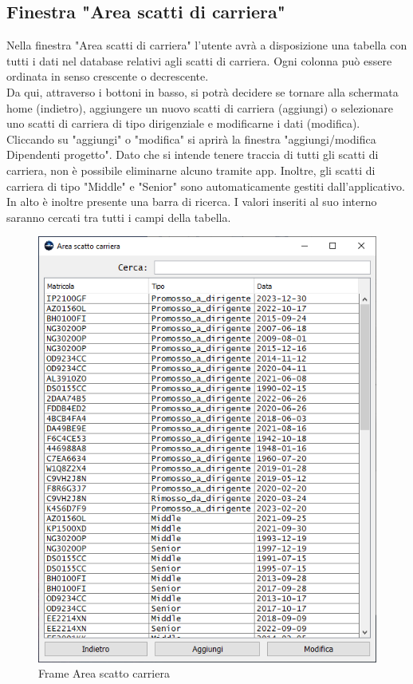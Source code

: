         \subsection {Finestra "Area scatti di carriera"}
            Nella finestra "Area scatti di carriera" l'utente avrà a disposizione una tabella con tutti i dati nel database relativi agli scatti di carriera. Ogni colonna può essere ordinata in senso crescente o decrescente.\\
            Da qui, attraverso i bottoni in basso, si potrà decidere se tornare alla schermata home (indietro), aggiungere un nuovo scatti di carriera (aggiungi) o selezionare uno scatti di carriera di tipo dirigenziale e modificarne i dati (modifica). Cliccando su "aggiungi" o "modifica" si aprirà la finestra "aggiungi/modifica Dipendenti progetto". Dato che si intende tenere traccia di tutti gli scatti di carriera, non è possibile eliminarne alcuno tramite app. Inoltre, gli scatti di carriera di tipo "Middle" e "Senior" sono automaticamente gestiti dall'applicativo.\\
            In alto è inoltre presente una barra di ricerca. I valori inseriti al suo interno saranno cercati tra tutti i campi della tabella.
            \begin{figure}[htbp!]
                \centering
                    \vspace{2\baselineskip}
                    \includegraphics[width=0.6\linewidth]{Immagini/Frames/Frame Area/Frame Area scatto carriera.png}
                \caption{Frame Area scatto carriera}
                \label{fig:Frame Area scatto carriera}
            \end{figure}

